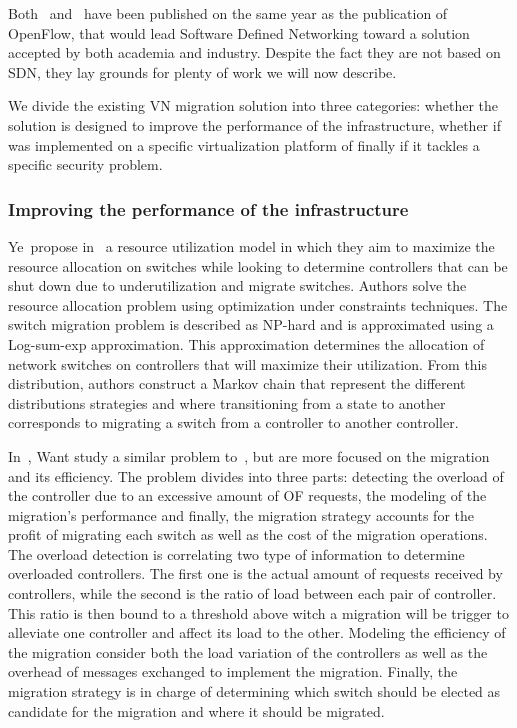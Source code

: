 Both~\cite{VROOM-Wang2008} and~\cite{VNE-Yu2008} have been published on the same year as the publication of OpenFlow, that would lead Software Defined Networking toward a solution accepted by both academia and industry.
Despite the fact they are not based on SDN, they lay grounds for plenty of work we will now describe.

We divide the existing VN migration solution into three categories: whether the solution is designed to improve the performance of the infrastructure, whether if was implemented on a specific virtualization platform of finally if it tackles a specific security problem.

\subsubsection{Improving the performance of the infrastructure}
Ye~\etal propose in~\cite{Ye2017a} a resource utilization model in which they aim to maximize the resource allocation on switches while looking to determine controllers that can be shut down due to underutilization and migrate switches.
Authors solve the resource allocation problem using optimization under constraints techniques. 
The switch migration problem is described as NP-hard and is approximated using a Log-sum-exp approximation.
This approximation determines the allocation of network switches on controllers that will maximize their utilization. 
From this distribution, authors construct a Markov chain that represent the different distributions strategies and where transitioning from a state to another corresponds to migrating a switch from a controller to another controller.

In~\cite{Wang2017d}, Want \etal study a similar problem to~\cite{Ye2017a}, but are more focused on the migration and its efficiency. 
The problem divides into three parts: detecting the overload of the controller due to an excessive amount of OF requests, the modeling of the migration's performance and finally, the migration strategy accounts for the profit of migrating each switch as well as the cost of the migration operations.
The overload detection is correlating two type of information to determine overloaded controllers.
The first one is the actual amount of requests received by controllers, while the second is the ratio of load between each pair of controller.
This ratio is then bound to a threshold above witch a migration will be trigger to alleviate one controller and affect its load to the other.
Modeling the efficiency of the migration consider both the load variation of the controllers as well as the overhead of messages exchanged to implement the migration.  
Finally, the migration strategy is in charge of determining which switch should be elected as candidate for the migration and where it should be migrated.

